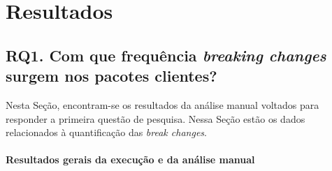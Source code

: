 \chapter{Resultados}
\label{cap:results}

\section{RQ1. Com que frequência \textit{breaking changes} surgem  nos pacotes clientes?}

Nesta Seção, encontram-se os resultados da análise manual voltados para responder a primeira questão de pesquisa. Nessa Seção estão os dados relacionados à quantificação das \textit{break changes}.

\subsubsection{Resultados gerais da execução e da análise manual}


